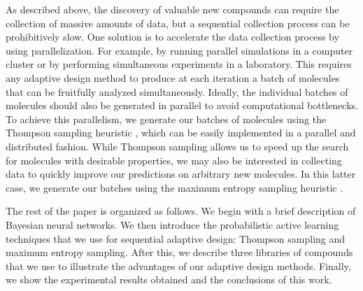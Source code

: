 As described above, the discovery of valuable new compounds can require the collection of massive amounts of data, but a sequential collection process can be prohibitively slow.  One solution is to accelerate the data collection process by using parallelization. For example, by running parallel simulations in a computer cluster or by performing simultaneous experiments in a laboratory. This requires any adaptive design method to produce at each iteration a batch of molecules that can be fruitfully analyzed simultaneously. Ideally, the individual batches of molecules should also be generated in parallel to avoid computational bottlenecks. To achieve this parallelism, we generate our batches of molecules using the Thompson sampling heuristic \cite{Thompson_1933}, which can be easily implemented in a parallel and distributed fashion. While Thompson sampling allows us to speed up the search for molecules with desirable properties, we may also be interested in collecting data to quickly improve our predictions on arbitrary new molecules. In this latter case, we generate our batches using the maximum entropy sampling heuristic \cite{MacKay_1992}.

The rest of the paper is organized as follows. We begin with a brief description of Bayesian neural networks. We then introduce the probabilistic active learning techniques that we use for sequential adaptive design: Thompson sampling and maximum entropy sampling. After this, we describe three libraries of compounds that we use to illustrate the advantages of our adaptive design methods. Finally, we show the experimental results obtained and the conclusions of this work.
